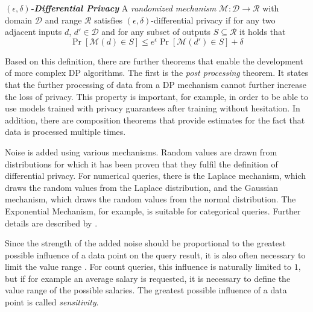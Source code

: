 \begin{definition}
  \emph{\textbf{$(\epsilon, \delta)$-Differential Privacy}} A \textit{randomized mechanism} $\mathcal{M}: \mathcal{D} \rightarrow \mathcal{R}$ with domain $\mathcal{D}$ and range $\mathcal{R}$ satisfies $(\epsilon, \delta)$-differential privacy if for any two adjacent inputs $d$, $d' \in \mathcal{D}$ and for any subset of outputs $S \subseteq \mathcal{R}$ it holds that $$\Pr[\mathcal{M}(d) \in S] \leq e^{\epsilon} \Pr[\mathcal{M}(d') \in S] + \delta$$
\end{definition}

Based on this definition, there are further theorems that enable the development of more complex DP algorithms. The first is the \textit{post processing} theorem. It states that the further processing of data from a DP mechanism cannot further increase the loss of privacy. This property is important, for example, in order to be able to use models trained with privacy guarantees after training without hesitation. In addition, there are composition theorems that provide estimates for the fact that data is processed multiple times.

Noise is added using various mechanisms. Random values are drawn from distributions for which it has been proven that they fulfil the definition of differential privacy. For numerical queries, there is the Laplace mechanism, which draws the random values from the Laplace distribution, and the Gaussian mechanism, which draws the random values from the normal distribution. The Exponential Mechanism, for example, is suitable for categorical queries. Further details are described by \textcite{chang:2023}.

Since the strength of the added noise should be proportional to the greatest possible influence of a data point on the query result, it is also often necessary to limit the value range \parencite[p.31]{chang:2023}. For count queries, this influence is naturally limited to $1$, but if for example an average salary is requested, it is necessary to define the value range of the possible salaries. The greatest possible influence of a data point is called \textit{sensitivity}.

